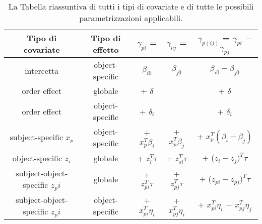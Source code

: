 	\begin{table}[!htb]%
	
	\renewcommand{\arraystretch}{1.7}
	\centering
	\begin{tabular}{c c c c c}
		\hline	
		
		\textbf{Tipo di covariate} & \textbf{Tipo di effetto} & \textbf{$\gamma_{pi}$ =}& \textbf{$\gamma_{pj}$ =} & \textbf{$\gamma_{p(ij)}$ = $\gamma_{pi}$ $-$ $\gamma_{pj}$} \\	
		\hline			
		intercetta & object-specific & $\beta_{i0}$ & $\beta_{j0}$ & $\beta_{i0} - \beta_{j0}$\\
		order effect & globale & + $\delta$ &  & + $\delta$ \\
		order effect & object-specific &  + $\delta_i$ &  &  + $\delta_i$\\
		subject-specific $x_p$ & object-specific & + $x^T_p\beta_i$ & + $x^T_p\beta_j$ & + $x^T_p(\beta_i - \beta_j)$\\
		object-specific $z_i$ & globale & + $z^T_{i}\tau$ & + $z^T_{si}\tau$ & + ($z_{i} - z_{j})^T\tau$\\
		subject-object-specific $z_pi$ & globale & + $z^T_{pi}\tau$ & + $z^T_{pj}\tau$ & + ($z_{pi} - z_{pj})^T\tau$\\
		subject-object-specific $z_pi$ & object-specific & + $x^T_{pi}\eta_i$ & + $x^T_{pj}\eta_i$& + $x^T_{pi}\eta_i$ $-$ $x^T_{pj}\eta_j$\\
		\hline
		
		
	\end{tabular} \hbox{}
	
	\caption{La Tabella riassuntiva di tutti i tipi di covariate e di tutte le possibili parametrizzazioni applicabili.} \label{tab:type}
\end{table}





